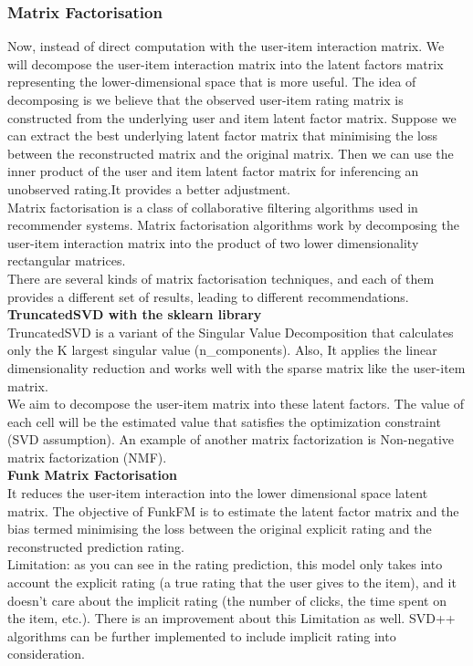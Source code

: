\subsubsection{Matrix Factorisation}
Now, instead of direct computation with the user-item interaction matrix. We will decompose the user-item interaction matrix into the latent factors matrix representing the lower-dimensional space that is more useful. The idea of decomposing is we believe that the observed user-item rating matrix is constructed from the underlying user and item latent factor matrix. Suppose we can extract the best underlying latent factor matrix that minimising the loss between the reconstructed matrix and the original matrix. Then we can use the inner product of the user and item latent factor matrix for inferencing an unobserved rating.It provides a better  adjustment.
\\Matrix factorisation is a class of collaborative filtering algorithms used in recommender systems. Matrix factorisation algorithms work by decomposing the user-item interaction matrix into the product of two lower dimensionality rectangular matrices.
\\There are several kinds of matrix factorisation techniques, and each of them provides a different set of results, leading to different recommendations.
\\ \textbf{TruncatedSVD with the sklearn library}
\\TruncatedSVD is a variant of the Singular Value Decomposition that calculates only the K largest singular value (n\_components). Also, It applies the linear dimensionality reduction and works well with the sparse matrix like the user-item matrix.
\\We aim to decompose the user-item matrix into these latent factors. The value of each cell will be the estimated value that satisfies the optimization constraint (SVD assumption). An example of another matrix factorization is Non-negative matrix factorization (NMF).
\\ \textbf{Funk Matrix Factorisation}
\\It reduces the user-item interaction into the lower dimensional space latent matrix. The objective of FunkFM is to estimate the latent factor matrix and the bias termed minimising the loss between the original explicit rating and the reconstructed prediction rating.
\\ Limitation: as you can see in the rating prediction, this model only takes into account the explicit rating (a true rating that the user gives to the item), and it doesn't care about the implicit rating (the number of clicks, the time spent on the item, etc.). There is an improvement about this Limitation as well. SVD++ algorithms can be further implemented to include implicit rating into consideration.
